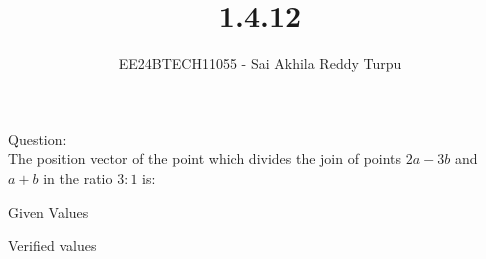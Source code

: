 \documentclass[journal]{IEEEtran}
\begin{document}

\title{1.4.12}
\author{EE24BTECH11055 - Sai Akhila Reddy Turpu}
{\let\newpage\relax\maketitle}
\renewcommand{\thefigure}{\theenumi}
\renewcommand{\thetable}{\theenumi}
\setlength{\intextsep}{10pt} %
\renewcommand{\thetable}{\theenumi}
Question:\\
The position vector of the point which divides the join of points $2a-3b$ and $a + b$ in the ratio $3:1$ is:\\
\begin{table}[h]
    \centering
    
    \caption{Given Values}
    \label{tab:1}
\end{table}
\begin{table}[h]
	\centering
	
	\caption{Verified values}
	\label{tab:2}
\end{table}
\end{document}
